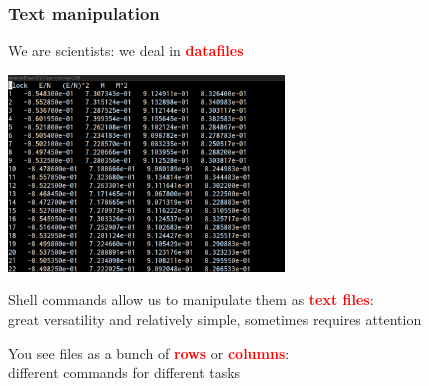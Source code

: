 \documentclass[unknownkeysallowed, 10pt, a4 paper, handout]{beamer}
\newcommand{\focus}[1]{\textbf{\textcolor{red}{#1}}}
\begin{document}
\begin{frame}
  \begin{center}
    \frametitle{Text manipulation}
    We are scientists: we deal in \focus{datafiles}

    \begin{center}
      \includegraphics[width=0.55\textwidth]{pics/datafile.png}
    \end{center}

    Shell commands allow us to manipulate them as \focus{text files}:\\
    great versatility and relatively simple, sometimes requires attention

    You see files as a bunch of \focus{rows} or \focus{columns}:\\
    different commands for different tasks
  \end{center}
\end{frame}
\end{document}
